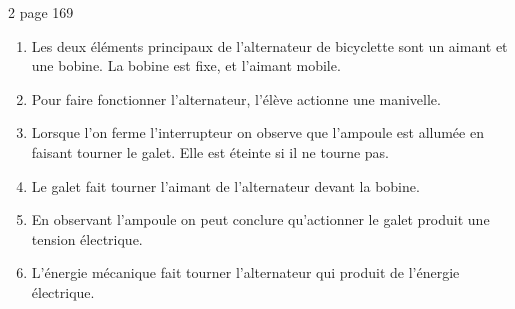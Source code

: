 \begin{myact}{2 page 169}
	\begin{enumerate}
		\item Les deux éléments principaux de l'alternateur de bicyclette sont un aimant et une bobine. La bobine est fixe, et l'aimant mobile.\pause
		\item Pour faire fonctionner l'alternateur, l'élève actionne une manivelle.\pause
		\item Lorsque l'on ferme l'interrupteur on observe que l'ampoule est allumée en faisant tourner le galet. Elle est éteinte si il ne tourne pas. \pause
		\item Le galet fait tourner l'aimant de l'alternateur devant la bobine.\pause
		\item En observant l'ampoule on peut conclure qu'actionner le galet produit une tension électrique.\pause
		\item L'énergie mécanique fait tourner l'alternateur qui produit de l'énergie électrique.
	\end{enumerate}
\end{myact}